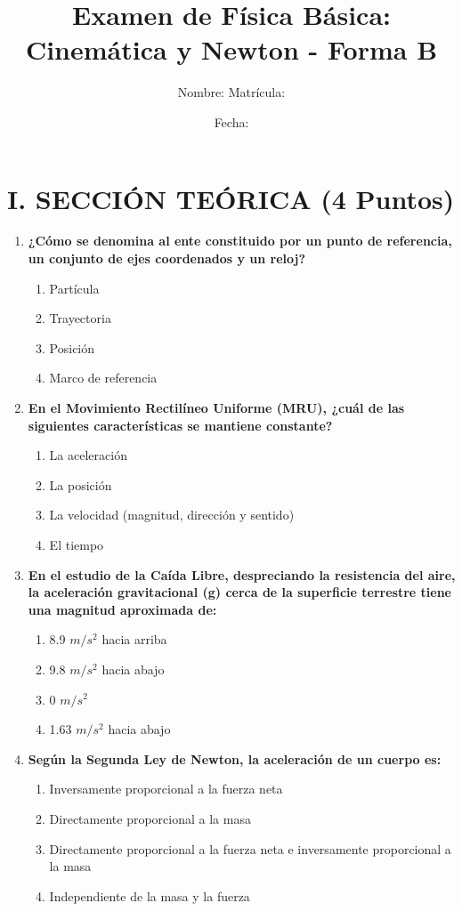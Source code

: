 \documentclass[12pt]{article}
\title{Examen de Física Básica: Cinemática y Newton - Forma B}
\author{Nombre: \underline{\hspace{8cm}} \quad Matrícula: \underline{\hspace{3cm}}}
\date{Fecha: \underline{\hspace{4cm}}}
\begin{document}
\maketitle

\section*{I. SECCIÓN TEÓRICA (4 Puntos)}

\begin{enumerate}[label=\arabic*.]
    \item \textbf{¿Cómo se denomina al ente constituido por un punto de referencia, un conjunto de ejes coordenados y un reloj?}
    \begin{enumerate}[label=\alph*)]
        \item Partícula
        \item Trayectoria
        \item Posición
        \item Marco de referencia
    \end{enumerate}

    \item \textbf{En el Movimiento Rectilíneo Uniforme (MRU), ¿cuál de las siguientes características se mantiene constante?}
    \begin{enumerate}[label=\alph*)]
        \item La aceleración
        \item La posición
        \item La velocidad (magnitud, dirección y sentido)
        \item El tiempo
    \end{enumerate}

    \item \textbf{En el estudio de la Caída Libre, despreciando la resistencia del aire, la aceleración gravitacional (g) cerca de la superficie terrestre tiene una magnitud aproximada de:}
    \begin{enumerate}[label=\alph*)]
        \item 8.9 $m/s^2$ hacia arriba
        \item 9.8 $m/s^2$ hacia abajo
        \item 0 $m/s^2$
        \item 1.63 $m/s^2$ hacia abajo
    \end{enumerate}

    \item \textbf{Según la Segunda Ley de Newton, la aceleración de un cuerpo es:}
    \begin{enumerate}[label=\alph*)]
        \item Inversamente proporcional a la fuerza neta
        \item Directamente proporcional a la masa
        \item Directamente proporcional a la fuerza neta e inversamente proporcional a la masa
        \item Independiente de la masa y la fuerza
    \end{enumerate}
\end{enumerate}
\end{document}
